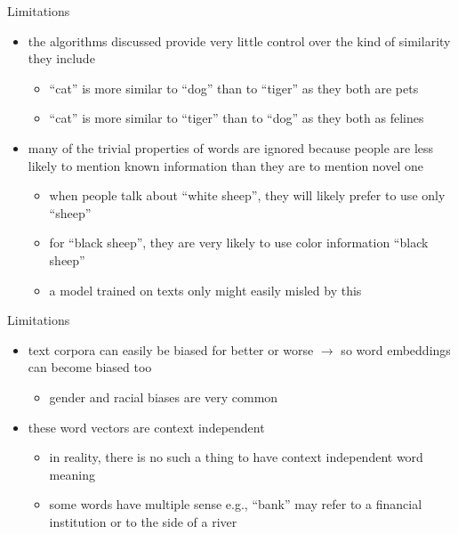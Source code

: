  \begin{frame}{Limitations}
 \begin{itemize}
     \item<1-> the algorithms discussed provide very little control over the kind of similarity they include
     \begin{itemize}
         \item<2-> ``cat'' is more similar to ``dog'' than to ``tiger'' as they both are pets
         \item<3-> ``cat'' is more similar to ``tiger'' than to ``dog'' as they both as felines
     \end{itemize}
     \item<4-> many of the trivial properties of words are ignored because people are less likely to mention known information than they are to mention novel one
     \begin{itemize}
         \item<5-> when people talk about ``white sheep'', they will likely prefer to use only ``sheep''
         \item<6-> for ``black sheep'', they are very likely to use color information ``black sheep''
         \item<7-> a model trained on texts only might easily misled by this
     \end{itemize}
 \end{itemize}
 \end{frame}
 \begin{frame}{Limitations}\begin{itemize}
     \item<1-> text corpora can easily be biased for better or worse $\rightarrow$  so word embeddings can become biased too
     \begin{itemize}
         \item<2-> gender and racial biases are very common
     \end{itemize}
     \item<3-> these word vectors are context independent
     \begin{itemize}
         \item<4-> in reality, there is no such a thing to have context independent word meaning
         \item<5-> some words have multiple sense e.g., ``bank'' may refer to a financial institution or to the side of a river
     \end{itemize}
 \end{itemize}\end{frame}
 